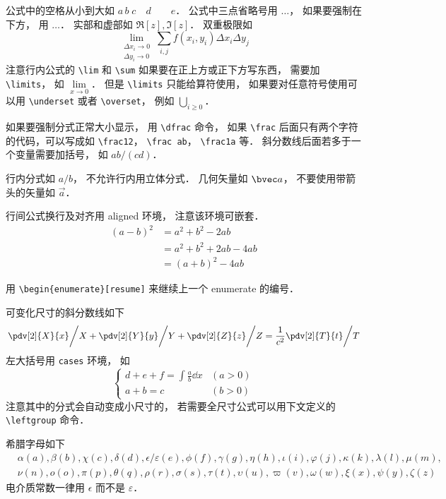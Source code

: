 公式中的空格从小到大如 $a\, b\; c\quad d\qquad e$． 公式中三点省略号用 $\dots$， 如果要强制在下方， 用 $\ldots$． 实部和虚部如 $\Re[z], \Im[z]$． 双重极限如
\begin{equation}
\lim_{\substack{\Delta x_i\to 0\\ \Delta y_i\to 0}} \sum_{i, j} f(x_i,y_i) \Delta x_i \Delta y_j
\end{equation}
注意行内公式的 \verb|\lim| 和 \verb|\sum| 如果要在正上方或正下方写东西， 需要加 \verb|\limits|， 如 $\lim\limits_{x\to 0}$． 但是 \verb|\limits| 只能给算符使用， 如果要对任意符号使用可以用 \verb|\underset| 或者 \verb|\overset|， 例如 $\underset{i \ge 0}{\bigcup}$．

如果要强制分式正常大小显示， 用 \verb|\dfrac| 命令， 如果 \verb|\frac| 后面只有两个字符的代码，可以写成如 \verb|\frac12|， \verb|\frac ab|， \verb|\frac1a| 等． 斜分数线后面若多于一个变量需要加括号， 如 $ab/(cd)$．

行内分式如 $a/b$， 不允许行内用立体分式． 几何矢量如 $\bvec a$， 不要使用带箭头的矢量如 $\vec a$． 

行间公式换行及对齐用 aligned 环境， 注意该环境可嵌套．
\begin{equation}
\begin{aligned}
(a-b)^2 &= a^2+b^2 - 2ab \\
& = a^2+b^2+2ab-4ab\\
& = (a+b)^2-4ab
\end{aligned}
\end{equation}

用 \verb|\begin{enumerate}[resume]|  来继续上一个 enumerate 的编号．

可变化尺寸的斜分数线如下
\begin{equation}
\left. \pdv[2]{X}{x} \middle/ X + \pdv[2]{Y}{y} \middle/ Y + \pdv[2]{Z}{z} \middle/ Z  = \frac{1}{c^2}  \pdv[2]{T}{t} \middle/ T\right.
\end{equation}
左大括号用 \verb|cases| 环境， 如
\begin{equation}
\begin{cases}
d+e+f = \int \frac{a}{b} \dd{x} &(a > 0)\\
a+b = c &(b > 0)
\end{cases}
\end{equation}
注意其中的分式会自动变成小尺寸的， 若需要全尺寸公式可以用下文定义的 \verb|\leftgroup| 命令．

希腊字母如下
\begin{equation}
\begin{aligned}
&\alpha (a), \beta (b), \chi (c), \delta (d), \epsilon/\varepsilon (e), \phi (f), \gamma (g),
\eta (h), \iota (i), \varphi (j), \kappa (k), \lambda (l), \mu (m),\\
& \nu (n), o (o), \pi (p), \theta (q), \rho (r), \sigma (s), \tau (t), \upsilon (u), \varpi (v), \omega (w), \xi (x), \psi (y), \zeta (z)
\end{aligned}
\end{equation}
电介质常数一律用 $\epsilon$ 而不是 $\varepsilon$．

